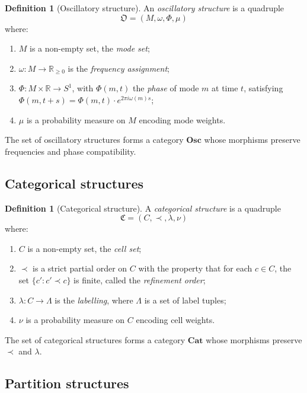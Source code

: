 \documentclass[11pt,a4paper]{article}
\theoremstyle{thmstyle}
\theoremstyle{thmstyle}
\theoremstyle{definition}
\newtheorem{definition}[theorem]{Definition}
\theoremstyle{remark}
\newcommand{\Real}{\mathbb{R}}
\newcommand{\Osc}{\mathfrak{O}}
\newcommand{\Cat}{\mathfrak{C}}
\newcommand{\Cat}{\mathfrak{C}}
\begin{document}
\begin{definition}[Oscillatory structure]\label{def:osc}
An \emph{oscillatory structure} is a quadruple
\[
\Osc = (M, \omega, \Phi, \mu)
\]
where:
\begin{enumerate}[nosep,label=(\roman*)]
\item $M$ is a non-empty set, the \emph{mode set};
\item $\omega : M \to \Real_{\geq 0}$ is the
      \emph{frequency assignment};
\item $\Phi : M \times \Real \to S^{1}$, with
      $\Phi(m, t)$ the \emph{phase} of mode $m$ at time
      $t$, satisfying $\Phi(m, t+s) =
      \Phi(m, t) \cdot e^{2\pi i \omega(m) s}$;
\item $\mu$ is a probability measure on $M$ encoding
      mode weights.
\end{enumerate}
The set of oscillatory structures forms a category
$\mathbf{Osc}$ whose morphisms preserve frequencies
and phase compatibility.
\end{definition}

\subsection{Categorical structures}

\begin{definition}[Categorical structure]\label{def:cat}
A \emph{categorical structure} is a quadruple
\[
\Cat = (C, \prec, \lambda, \nu)
\]
where:
\begin{enumerate}[nosep,label=(\roman*)]
\item $C$ is a non-empty set, the \emph{cell set};
\item $\prec$ is a strict partial order on $C$
      with the property that for each $c \in C$,
      the set $\{c' : c' \prec c\}$ is finite, called
      the \emph{refinement order};
\item $\lambda : C \to \Lambda$ is the
      \emph{labelling}, where $\Lambda$ is a set of
      label tuples;
\item $\nu$ is a probability measure on $C$ encoding
      cell weights.
\end{enumerate}
The set of categorical structures forms a category
$\mathbf{Cat}$ whose morphisms preserve $\prec$ and
$\lambda$.
\end{definition}

\subsection{Partition structures}
\end{document}
